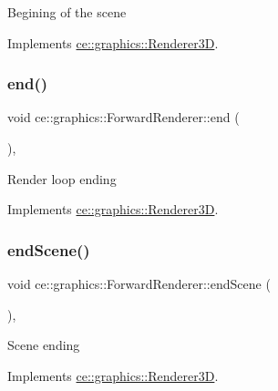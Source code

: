 Begining of the scene 

Implements \hyperlink{classce_1_1graphics_1_1_renderer3_d_a308b1b75bf6ac0d73f89ce89840f632a}{ce\+::graphics\+::\+Renderer3D}.

\mbox{\label{classce_1_1graphics_1_1_forward_renderer_a8a8c16a645e63fd54b932f62d96d805b}} 
\subsubsection{\texorpdfstring{end()}{end()}}
{\footnotesize\ttfamily void ce\+::graphics\+::\+Forward\+Renderer\+::end (\begin{DoxyParamCaption}{ }\end{DoxyParamCaption})\hspace{0.3cm}{\ttfamily [override]}, {\ttfamily [virtual]}}

Render loop ending 

Implements \hyperlink{classce_1_1graphics_1_1_renderer3_d_a4d35e07f42a4fb42ebe3f8e57bfcdb58}{ce\+::graphics\+::\+Renderer3D}.

\mbox{\label{classce_1_1graphics_1_1_forward_renderer_a34bf60e44a9a594ab596f46ca7688e3e}} 
\subsubsection{\texorpdfstring{end\+Scene()}{endScene()}}
{\footnotesize\ttfamily void ce\+::graphics\+::\+Forward\+Renderer\+::end\+Scene (\begin{DoxyParamCaption}{ }\end{DoxyParamCaption})\hspace{0.3cm}{\ttfamily [override]}, {\ttfamily [virtual]}}

Scene ending 

Implements \hyperlink{classce_1_1graphics_1_1_renderer3_d_a0b8feaf1dd7f6ee03c7be2197d012e25}{ce\+::graphics\+::\+Renderer3D}.

\mbox{\label{classce_1_1graphics_1_1_forward_renderer_ac6c7ad9a18ecfb2cbb6aee202e7e2e8f}} 
